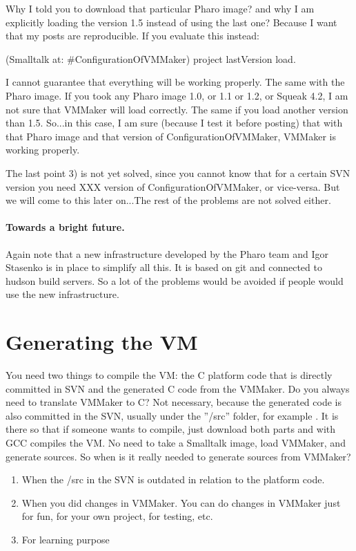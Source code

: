 \documentclass[a4paper,10pt,twoside]{book}
\begin{document}
Why I told you to download that particular Pharo image? and why I am explicitly loading the version 1.5 instead of using the last one?  Because I want that my posts are reproducible. If you evaluate this instead:

\begin{code}{}
(Smalltalk at: #ConfigurationOfVMMaker) project lastVersion load.
\end{code}

I cannot guarantee that everything will be working properly. The same with the Pharo image. If you took any Pharo image 1.0, or 1.1 or 1.2, or Squeak 4.2, I am not sure that VMMaker will load correctly. The same if you load another version than 1.5. So...in this case, I am sure (because I test it before posting) that with that Pharo image and that version of ConfigurationOfVMMaker, VMMaker is working properly.

The last point 3) is not yet solved, since you cannot know that for a certain SVN version you need XXX version of ConfigurationOfVMMaker, or vice-versa. But we will come to this later on...The rest of the problems are not solved either.

\paragraph{Towards a bright future.}
Again note that a new infrastructure developed by the Pharo team and Igor Stasenko is in place to simplify all this. It is based on git and connected to hudson build servers. So a lot of the problems would be avoided if people would use the new infrastructure. 


\section{Generating the VM}

You need two things to compile the VM: the C platform code that is directly committed in SVN and the generated C code from the VMMaker. Do you always need to translate VMMaker to C? Not necessary, because the generated code is also committed in the SVN, usually under the ''/src'' folder, for example . 
It is there so that if someone wants to compile, just download both parts and with GCC compiles the VM. No need to take a Smalltalk image, load VMMaker, and generate sources. So when is it really needed to generate sources from VMMaker?

\begin{enumerate}
\item When the /src in the SVN is outdated in relation to the platform code.
\item When you did changes in VMMaker. You can do changes in VMMaker just for fun, for your own project, for testing, etc.
\item For learning purpose 
\end{enumerate}
\end{document}
